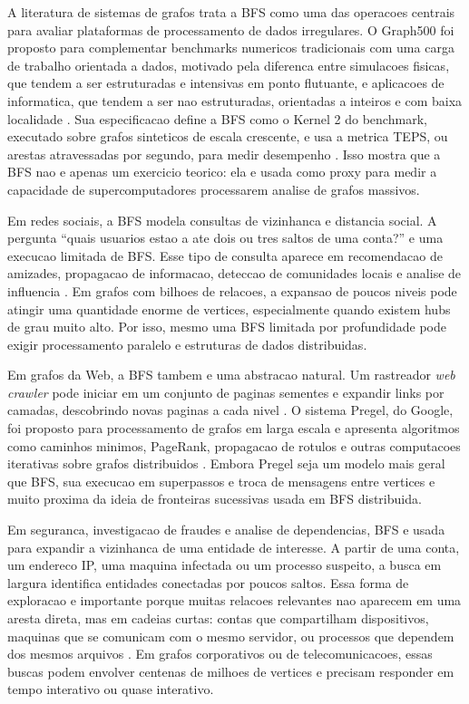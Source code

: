 \documentclass{article}
\begin{document}
A literatura de sistemas de grafos trata a BFS como uma das operacoes centrais
para avaliar plataformas de processamento de dados irregulares. O Graph500 foi
proposto para complementar benchmarks numericos tradicionais com uma carga de
trabalho orientada a dados, motivado pela diferenca entre simulacoes fisicas,
que tendem a ser estruturadas e intensivas em ponto flutuante, e aplicacoes de
informatica, que tendem a ser nao estruturadas, orientadas a inteiros e com
baixa localidade \cite{murphygraph500}. Sua especificacao define a BFS como o
Kernel 2 do benchmark, executado sobre grafos sinteticos de escala crescente, e
usa a metrica TEPS, ou arestas atravessadas por segundo, para medir desempenho
\cite{graph500spec}. Isso mostra que a BFS nao e apenas um exercicio teorico:
ela e usada como proxy para medir a capacidade de supercomputadores processarem
analise de grafos massivos.

Em redes sociais, a BFS modela consultas de vizinhanca e distancia social. A
pergunta ``quais usuarios estao a ate dois ou tres saltos de uma conta?'' e uma
execucao limitada de BFS. Esse tipo de consulta aparece em recomendacao de
amizades, propagacao de informacao, deteccao de comunidades locais e analise de
influencia \cite{easleykleinberg}. Em grafos com bilhoes de relacoes, a
expansao de poucos niveis pode atingir uma quantidade enorme de vertices,
especialmente quando existem hubs de grau muito alto. Por isso, mesmo uma BFS
limitada por profundidade pode exigir processamento paralelo e estruturas de
dados distribuidas.

Em grafos da Web, a BFS tambem e uma abstracao natural. Um rastreador
\textit{web crawler} pode iniciar em um conjunto de paginas sementes e expandir
links por camadas, descobrindo novas paginas a cada nivel \cite{brinpage}. O
sistema Pregel, do Google, foi proposto para processamento de grafos em larga
escala e apresenta algoritmos como caminhos minimos, PageRank, propagacao de
rotulos e outras computacoes iterativas sobre grafos distribuidos \cite{pregel}.
Embora Pregel seja um modelo mais geral que BFS, sua execucao em superpassos e
troca de mensagens entre vertices e muito proxima da ideia de fronteiras
sucessivas usada em BFS distribuida.

Em seguranca, investigacao de fraudes e analise de dependencias, BFS e usada
para expandir a vizinhanca de uma entidade de interesse. A partir de uma conta,
um endereco IP, uma maquina infectada ou um processo suspeito, a busca em
largura identifica entidades conectadas por poucos saltos. Essa forma de
exploracao e importante porque muitas relacoes relevantes nao aparecem em uma
aresta direta, mas em cadeias curtas: contas que compartilham dispositivos,
maquinas que se comunicam com o mesmo servidor, ou processos que dependem dos
mesmos arquivos \cite{akoglugraphanomaly}. Em grafos corporativos ou de
telecomunicacoes, essas buscas podem envolver centenas de milhoes de vertices e
precisam responder em tempo interativo ou quase interativo.
\end{document}
